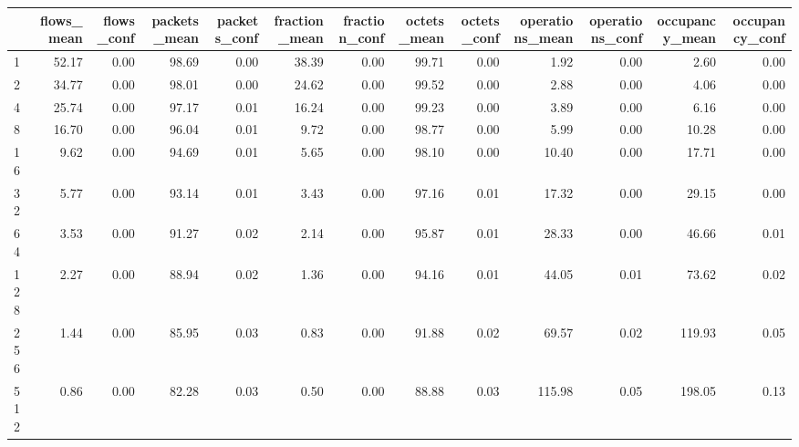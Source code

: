 \begin{tabular}{lrrrrrrrrrrrr}
\toprule
{} &  flows\_mean &  flows\_conf &  packets\_mean &  packets\_conf &  fraction\_mean &  fraction\_conf &  octets\_mean &  octets\_conf &  operations\_mean &  operations\_conf &  occupancy\_mean &  occupancy\_conf \\
\midrule
1        &       52.17 &        0.00 &         98.69 &          0.00 &          38.39 &           0.00 &        99.71 &         0.00 &             1.92 &             0.00 &            2.60 &            0.00 \\
2        &       34.77 &        0.00 &         98.01 &          0.00 &          24.62 &           0.00 &        99.52 &         0.00 &             2.88 &             0.00 &            4.06 &            0.00 \\
4        &       25.74 &        0.00 &         97.17 &          0.01 &          16.24 &           0.00 &        99.23 &         0.00 &             3.89 &             0.00 &            6.16 &            0.00 \\
8        &       16.70 &        0.00 &         96.04 &          0.01 &           9.72 &           0.00 &        98.77 &         0.00 &             5.99 &             0.00 &           10.28 &            0.00 \\
16       &        9.62 &        0.00 &         94.69 &          0.01 &           5.65 &           0.00 &        98.10 &         0.00 &            10.40 &             0.00 &           17.71 &            0.00 \\
32       &        5.77 &        0.00 &         93.14 &          0.01 &           3.43 &           0.00 &        97.16 &         0.01 &            17.32 &             0.00 &           29.15 &            0.00 \\
64       &        3.53 &        0.00 &         91.27 &          0.02 &           2.14 &           0.00 &        95.87 &         0.01 &            28.33 &             0.00 &           46.66 &            0.01 \\
128      &        2.27 &        0.00 &         88.94 &          0.02 &           1.36 &           0.00 &        94.16 &         0.01 &            44.05 &             0.01 &           73.62 &            0.02 \\
256      &        1.44 &        0.00 &         85.95 &          0.03 &           0.83 &           0.00 &        91.88 &         0.02 &            69.57 &             0.02 &          119.93 &            0.05 \\
512      &        0.86 &        0.00 &         82.28 &          0.03 &           0.50 &           0.00 &        88.88 &         0.03 &           115.98 &             0.05 &          198.05 &            0.13 \\

\end{tabular}
